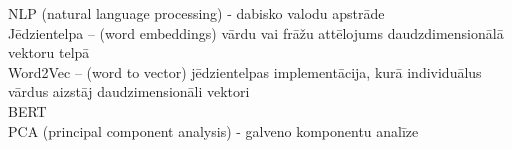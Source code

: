 NLP (natural language processing) - dabisko valodu apstrāde\\
Jēdzientelpa – (word embeddings) vārdu vai frāžu attēlojums daudzdimensionālā vektoru telpā\\
Word2Vec – (word to vector) jēdzientelpas implementācija, kurā individuālus vārdus aizstāj
daudzimensionāli vektori\\
BERT\\
PCA (principal component analysis) - galveno komponentu analīze